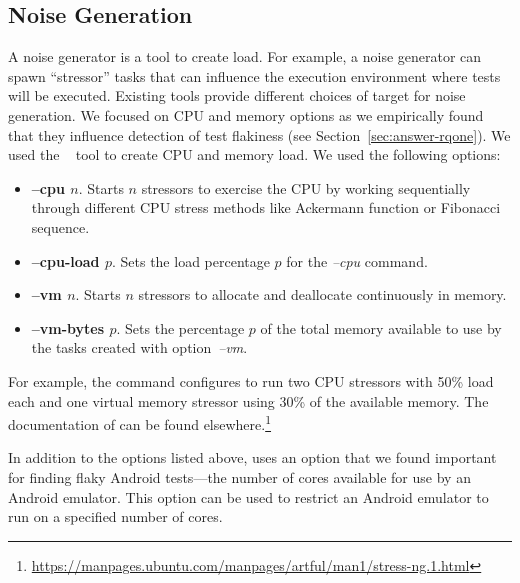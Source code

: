 \documentclass[conference]{IEEEtran}
\begin{document}

\subsection{Noise Generation}
\label{sec:noise-generation}

A noise generator is a tool to create load. For example, a noise generator can spawn ``stressor'' tasks that can influence the execution environment where tests will be executed. Existing tools provide different choices of target for noise generation. We focused on CPU and memory options as we empirically found that they influence detection of test flakiness (see Section~\ref{sec:answer-rqone}). We used the \sng{}~\cite{stress-ng} tool to create CPU and memory load. 
We used the following options:

\begin{itemize}[topsep=.2ex,itemsep=.2ex,leftmargin=0.8em]
    \item \textbf{--cpu $n$}. Starts $n$ stressors to exercise the CPU by working sequentially through different CPU stress methods like Ackermann function or Fibonacci sequence.
    \item \textbf{--cpu-load $p$}. Sets the load percentage $p$ for the \textit{--cpu} command.
    \item \textbf{--vm $n$}. Starts $n$ stressors to allocate and deallocate continuously in memory.
    \item \textbf{--vm-bytes $p$}. Sets the percentage $p$ of the total memory available to use by the tasks created with option~\textit{--vm}.
\end{itemize}

For example, the command  configures \sng{} to run two CPU stressors with 50\% load each and one virtual memory stressor using 30\% of the available memory. The documentation of \sng{} can be found elsewhere.\footnote{\url{https://manpages.ubuntu.com/manpages/artful/man1/stress-ng.1.html}} 

In addition to the options listed above, \tname{} uses an option that we found important for finding flaky Android tests---the number of cores available for use by an Android emulator. This option can be used to restrict an Android emulator to run on a specified number of cores. 
\end{document}
